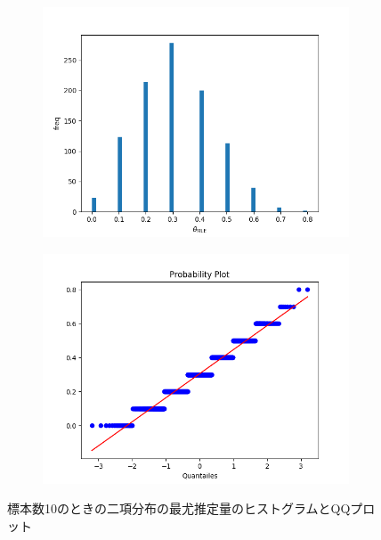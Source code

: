 \documentclass[class=jsarticle, crop=false, dvipdfmx, fleqn]{standalone}
\begin{document}
\begin{figure}
	\centering
    \begin{minipage}{0.45\linewidth}
        \begin{figure}[H]
        	   \centering
            \includegraphics[clip, width=\linewidth]{../figures/hist_n10.png}
            \label{fig:hist_n10}
        \end{figure}
    \end{minipage}
    \begin{minipage}{0.45\linewidth}
        \begin{figure}[H]
            \centering
            \includegraphics[clip, width=\linewidth]{../figures/qqplot_n10.png}
            \label{fig:qqplot_n10}
        \end{figure}
    \end{minipage}
    \caption{標本数10のときの二項分布の最尤推定量のヒストグラムとQQプロット}
    \label{fig:n10}
\end{figure}
\end{document}
